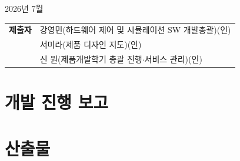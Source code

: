 \documentclass[11pt, oneside, openright]{book}
\begin{document}
\vspace{2.8em}
\begin{center}
  {\large 2026년 7월}
\end{center}
\vspace{2.0em}
\begin{center}
  \renewcommand{\arraystretch}{1.9}
  \begin{tabular}{@{}r@{\hskip 1.4em}l@{}}
    \sffamily\bfseries 제출자 & 강영민\quad(하드웨어 제어 및 시뮬레이션 SW 개발총괄)\quad(인) \\
                             & 서미라\quad(제품 디자인 지도)\quad(인) \\
                             & 신\,\,원\quad(제품개발학기 총괄 진행$\cdot$서비스 관리)\quad(인) \\
  \end{tabular}
\end{center}

\cleardoublepage
\pagestyle{plain}
\tableofcontents
\clearpage
\listoftables
\clearpage
\listoffigures
\clearpage
\listoflistings

\mainmatter
\pagestyle{fancy}

\part{개발 진행 보고}
\clearpage
\null\thispagestyle{empty}\clearpage
\ifodd\value{page}\else\null\thispagestyle{empty}\clearpage\fi




\part{산출물}
\appendix
\renewcommand{\appendixname}{부록}
\renewcommand{\thechapter}{부록\,\Alph{chapter}}
\renewcommand{\thesection}{\Alph{chapter}.\arabic{section}}
\renewcommand{\thesubsection}{\Alph{chapter}.\arabic{section}.\arabic{subsection}}
\renewcommand{\covernumberblock}{%
  {\sffamily\normalsize\color{aresorange}부록}\\[0.1em]
  {\sffamily\bfseries\color{deepblue}\fontsize{108}{108}\selectfont\Alph{chapter}}}











\backmatter
\printbibliography[heading=bibintoc, title={참고 문헌}]
\end{document}
